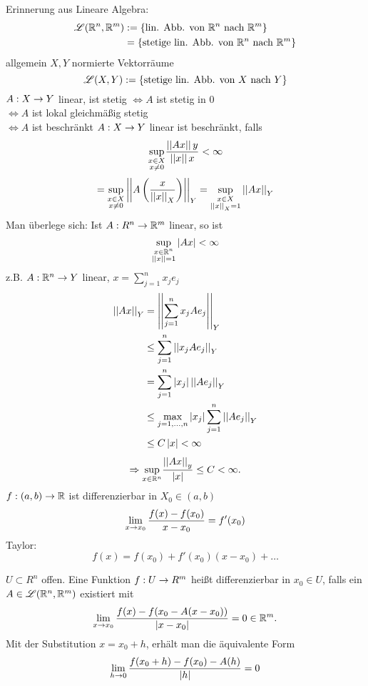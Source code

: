 \documentclass[../ana2.tex]{subfiles}
\begin{document}
Erinnerung aus Lineare Algebra:
\begin{align*}
    \mathscr{L}(\mathbb{R}^n, \mathbb{R}^m) 
    &:= \{\text{lin. Abb. von } \mathbb{R}^n \text{ nach } \mathbb{R}^m\}\\
    &= \{\text{stetige lin. Abb. von } \mathbb{R}^n \text{ nach } \mathbb{R}^m\}
\end{align*}
allgemein \( X, Y \) normierte Vektorräume
\[ \mathscr{L}(X, Y) := 
\{\text{stetige lin. Abb. von } X \text{ nach } Y\}  \]
\( A:X\rightarrow Y \) linear, ist stetig 
\( \Leftrightarrow A \) ist stetig in \(0\) \\
\( \Leftrightarrow A \) ist lokal gleichmäßig stetig \\
\( \Leftrightarrow A \) ist beschränkt
\( A:X\rightarrow Y \) linear ist beschränkt, falls 
\[ \underset{\substack{x\in X\\x \neq 0}}{\sup}
\frac{ \left|\left|Ax\right|\right|y }{\left|\left|x\right|\right|x} < \infty \]
\[ = \underset{\substack{x\in X\\x \neq 0}}{\sup} 
\left|\left| A\left(\frac{x}{\left|\left|x\right|\right|_X}\right) \right|\right|_Y
= \underset{\substack{x\in X\\\left|\left|x\right|\right|_X = 1}}{\sup} 
\left|\left|Ax\right|\right|_Y \]
Man überlege sich: Ist \( A:R^n\rightarrow \mathbb{R}^m \)
linear, so ist
\[ \underset{\substack{x\in \mathbb{R}^n \\ \left|\left|x\right|\right| = 1}}{\sup} \left|Ax\right| < \infty \]
z.B. \( A:\mathbb{R}^n\rightarrow Y \) linear, \(x = \sum_{j=1}^n x_j e_j\)
\begin{align*}
    \left|\left|Ax\right|\right|_Y &= \left|\left|\sum_{j=1}^n x_jAe_j\right|\right|_Y \\
    &\leq \sum_{j=1}^n \left|\left| x_j A e_j \right|\right|_Y \\
    &= \sum_{j=1}^n \left|x_j\right| \left|\left| A e_j \right|\right|_Y \\
    &\leq \underset{j=1,\ldots,n}{\max} \left|x_j\right| \sum_{j=1}^n \left|\left|A e_j\right|\right|_Y\\
    &\leq C \left|x\right| < \infty
\end{align*}
\[ \Rightarrow \underset{x\in\mathbb{R}^n}{\sup} 
\frac{ \left|\left|A x\right|\right|_y }{\left|x\right|} \leq C < \infty. \]
\( f:(a,b)\rightarrow \mathbb{R} \) ist differenzierbar in \( X_0 \in (a,b)\)
\[ \lim\limits_{x\rightarrow{}x_0} \frac{f(x)-f(x_0)}{x-x_0} = f'(x_0) \]
Taylor: \[ f(x) = f(x_0) + f'(x_0)(x - x_0) + \ldots \]
\begin{defi}[Ableitung]
    \( U \subset R^n \) offen. Eine Funktion \(f:U\rightarrow R^m\)
    heißt differenzierbar in \(x_0 \in U\), falls ein
    \( A \in \mathscr{L}(\mathbb{R}^n, \mathbb{R}^m) \) existiert mit
    \[ \lim\limits_{x\rightarrow{}x_0} \frac{f(x) -f(x_0 - A(x-x_0))}{\left|x-x_0\right|} 
    = 0 \in \mathbb{R}^m. \]
    Mit der Substitution \( x = x_0 + h \), 
    erhält man die äquivalente Form 
    \[ \lim\limits_{h\rightarrow{}0} \frac{ f(x_0 + h) - f(x_0) - A(h) }{\left|h\right|} = 0 \]
\end{defi}
\end{document}
